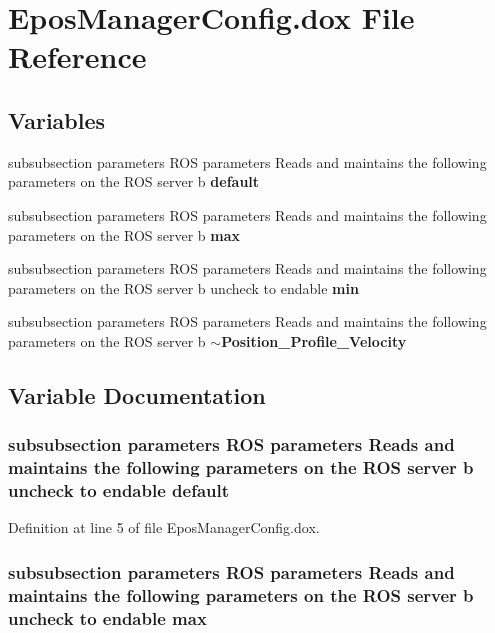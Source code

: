\section{\-Epos\-Manager\-Config.\-dox \-File \-Reference}
\label{EposManagerConfig_8dox}
\subsection*{\-Variables}
\begin{DoxyCompactItemize}
\item 
subsubsection parameters \-R\-O\-S \*
parameters \-Reads and maintains \*
the following parameters on \*
the \-R\-O\-S server b {\bf default}
\item 
subsubsection parameters \-R\-O\-S \*
parameters \-Reads and maintains \*
the following parameters on \*
the \-R\-O\-S server b {\bf max}
\item 
subsubsection parameters \-R\-O\-S \*
parameters \-Reads and maintains \*
the following parameters on \*
the \-R\-O\-S server b uncheck to \*
endable {\bf min}
\item 
subsubsection parameters \-R\-O\-S \*
parameters \-Reads and maintains \*
the following parameters on \*
the \-R\-O\-S server b {\bf $\sim$\-Position\-\_\-\-Profile\-\_\-\-Velocity}
\end{DoxyCompactItemize}


\subsection{\-Variable \-Documentation}
\subsubsection[{default}]{\setlength{\rightskip}{0pt plus 5cm}subsubsection parameters \-R\-O\-S parameters \-Reads and maintains the following parameters on the \-R\-O\-S server b uncheck to endable {\bf default}}\label{EposManagerConfig_8dox_adb36a153a297a36f55ff4df8c7ddfbf7}


\-Definition at line 5 of file \-Epos\-Manager\-Config.\-dox.

\subsubsection[{max}]{\setlength{\rightskip}{0pt plus 5cm}subsubsection parameters \-R\-O\-S parameters \-Reads and maintains the following parameters on the \-R\-O\-S server b uncheck to endable {\bf max}}\label{EposManagerConfig_8dox_a0a819a560144cee6323a0be3792d8447}



